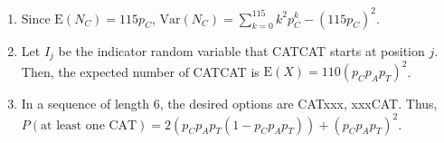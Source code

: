 \begin{enumerate}[label=(\alph*)]
\item Since $\text{E}(N_{C}) = 115p_{C}$, $\text{Var}(N_{C}) = \sum_{k=0}^
{115}k^{2}p_{C}^{k} - (115p_{C})^{2}$.

\item Let $I_{j}$ be the indicator random variable that CATCAT starts at
position $j$. Then, the expected number of CATCAT is $\text{E}(X) = 110(p_{C}p_
{A}p_{T})^{2}$.

\item In a sequence of length $6$, the desired options are CATxxx, xxxCAT. Thus,
$P(\text{at least one CAT}) = 2(p_{C}p_{A}p_{T}(1 - p_{C}p_{A}p_{T})) + (p_{C}p_
{A}p_{T})^{2}$.

\end{enumerate}